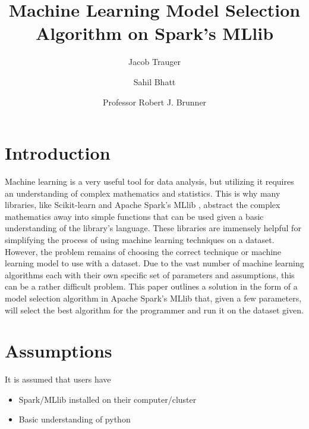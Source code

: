 \documentclass[9pt,twocolumn,twoside]{idsi}
\author[1]{Jacob Trauger}
\author[1]{Sahil Bhatt}
\author[2]{Professor Robert J. Brunner}
\affil[1]{Illinois Data Science Initiative}
\affil[2]{Laboratory for Computation, Data, and Machine Learning}
\title{Machine Learning Model Selection Algorithm on Spark's MLlib}
\begin{document}

\maketitle


\section{Introduction} 
Machine learning is a very useful tool for data analysis, but utilizing it requires an understanding of complex mathematics and statistics. This is why many libraries, like Scikit-learn \cite{scikit_learn} and Apache Spark's MLlib \cite{spark_mllib}, abstract the complex mathematics away into simple functions that can be used given a basic understanding of the library's language. These libraries are immensely helpful for simplifying the process of using machine learning techniques on a dataset. However, the problem remains of choosing the correct technique or machine learning model to use with a dataset. Due to the vast number of machine learning algorithms each with their own specific set of parameters and assumptions, this can be a rather difficult problem. 
This paper outlines a solution in the form of a model selection algorithm in Apache Spark's MLlib that, given a few parameters, will select the best algorithm for the programmer and run it on the dataset given. 

\section{Assumptions}
It is assumed that users have 
\begin{itemize}
\item Spark/MLlib installed on their computer/cluster
\item Basic understanding of python
\end{itemize}
\end{document}

